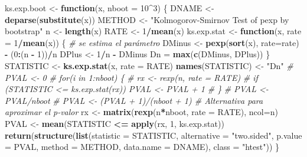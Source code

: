 \documentclass[]{book}
\newenvironment{Shaded}{\begin{snugshade}}{\end{snugshade}}
\newcommand{\KeywordTok}[1]{\textcolor[rgb]{0.13,0.29,0.53}{\textbf{#1}}}
\newcommand{\DataTypeTok}[1]{\textcolor[rgb]{0.13,0.29,0.53}{#1}}
\newcommand{\DecValTok}[1]{\textcolor[rgb]{0.00,0.00,0.81}{#1}}
\newcommand{\StringTok}[1]{\textcolor[rgb]{0.31,0.60,0.02}{#1}}
\newcommand{\CommentTok}[1]{\textcolor[rgb]{0.56,0.35,0.01}{\textit{#1}}}
\newcommand{\ControlFlowTok}[1]{\textcolor[rgb]{0.13,0.29,0.53}{\textbf{#1}}}
\newcommand{\OperatorTok}[1]{\textcolor[rgb]{0.81,0.36,0.00}{\textbf{#1}}}
\newcommand{\NormalTok}[1]{#1}
\theoremstyle{break}
\theoremstyle{definition}
\theoremstyle{definition}
\theoremstyle{definition}
\theoremstyle{remark}
\begin{document}
\begin{Shaded}
\begin{Highlighting}[]
\NormalTok{ks.exp.boot <-}\StringTok{ }\ControlFlowTok{function}\NormalTok{(x, }\DataTypeTok{nboot =} \DecValTok{10}\OperatorTok{^}\DecValTok{3}\NormalTok{) \{}
\NormalTok{  DNAME <-}\StringTok{ }\KeywordTok{deparse}\NormalTok{(}\KeywordTok{substitute}\NormalTok{(x))}
\NormalTok{  METHOD <-}\StringTok{ "Kolmogorov-Smirnov Test of pexp by bootstrap"} 
\NormalTok{  n <-}\StringTok{ }\KeywordTok{length}\NormalTok{(x)}
\NormalTok{  RATE <-}\StringTok{ }\DecValTok{1}\OperatorTok{/}\KeywordTok{mean}\NormalTok{(x)}
\NormalTok{  ks.exp.stat <-}\StringTok{ }\ControlFlowTok{function}\NormalTok{(x, }\DataTypeTok{rate =} \DecValTok{1}\OperatorTok{/}\KeywordTok{mean}\NormalTok{(x)) \{ }\CommentTok{# se estima el parámetro}
\NormalTok{    DMinus <-}\StringTok{ }\KeywordTok{pexp}\NormalTok{(}\KeywordTok{sort}\NormalTok{(x), }\DataTypeTok{rate=}\NormalTok{rate) }\OperatorTok{-}\StringTok{ }\NormalTok{(}\DecValTok{0}\OperatorTok{:}\NormalTok{(n }\OperatorTok{-}\StringTok{ }\DecValTok{1}\NormalTok{))}\OperatorTok{/}\NormalTok{n}
\NormalTok{    DPlus <-}\StringTok{ }\DecValTok{1}\OperatorTok{/}\NormalTok{n }\OperatorTok{-}\StringTok{ }\NormalTok{DMinus}
\NormalTok{    Dn =}\StringTok{ }\KeywordTok{max}\NormalTok{(}\KeywordTok{c}\NormalTok{(DMinus, DPlus))}
\NormalTok{  \}  }
\NormalTok{  STATISTIC <-}\StringTok{ }\KeywordTok{ks.exp.stat}\NormalTok{(x, }\DataTypeTok{rate =}\NormalTok{ RATE) }
  \KeywordTok{names}\NormalTok{(STATISTIC) <-}\StringTok{ "Dn"}
  \CommentTok{# PVAL <- 0}
  \CommentTok{# for(i in 1:nboot) \{}
  \CommentTok{#   rx <- rexp(n, rate = RATE)}
  \CommentTok{#   if (STATISTIC <= ks.exp.stat(rx)) PVAL <- PVAL + 1}
  \CommentTok{# \}}
  \CommentTok{# PVAL <- PVAL/nboot}
  \CommentTok{# PVAL <- (PVAL + 1)/(nboot + 1) # Alternativa para aproximar el p-valor}
\NormalTok{  rx <-}\StringTok{ }\KeywordTok{matrix}\NormalTok{(}\KeywordTok{rexp}\NormalTok{(n}\OperatorTok{*}\NormalTok{nboot, }\DataTypeTok{rate =}\NormalTok{ RATE), }\DataTypeTok{ncol=}\NormalTok{n)}
\NormalTok{  PVAL <-}\StringTok{ }\KeywordTok{mean}\NormalTok{(STATISTIC }\OperatorTok{<=}\StringTok{ }\KeywordTok{apply}\NormalTok{(rx, }\DecValTok{1}\NormalTok{, ks.exp.stat))}
  \KeywordTok{return}\NormalTok{(}\KeywordTok{structure}\NormalTok{(}\KeywordTok{list}\NormalTok{(}\DataTypeTok{statistic =}\NormalTok{ STATISTIC, }\DataTypeTok{alternative =} \StringTok{"two.sided"}\NormalTok{, }
                   \DataTypeTok{p.value =}\NormalTok{ PVAL, }\DataTypeTok{method =}\NormalTok{ METHOD, }\DataTypeTok{data.name =}\NormalTok{ DNAME), }
                   \DataTypeTok{class =} \StringTok{"htest"}\NormalTok{))}
\NormalTok{\}}
\end{Highlighting}
\end{Shaded}
\end{document}
